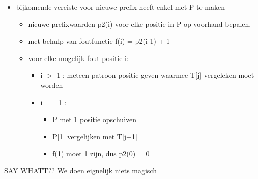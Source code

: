 \begin{itemize}
\begin{itemize}
\begin{itemize}
\end{itemize}
\end{itemize}
\item bijkomende vereiste voor nieuwe prefix heeft enkel met P te maken
\begin{itemize}
\item nieuwe prefixwaarden p2(i) voor elke positie in P op voorhand bepalen.
\item met behulp van foutfunctie f(i) = p2(i-1) + 1
\item voor elke mogelijk fout positie i:
\begin{itemize}
\item i $>$ 1 : meteen patroon positie geven waarmee T[j] vergeleken moet worden
\item i == 1 : 
\begin{itemize}
\item P met 1 positie opschuiven
\item P[1] vergelijken met T[j+1]
\item f(1) moet 1 zijn, dus p2(0) = 0
\end{itemize}
\end{itemize}
\end{itemize}
\end{itemize}
{\Huge SAY WHATT??}
\npar We doen eignelijk niets magisch
